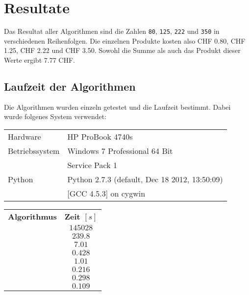 \documentclass[a4paper, 10pt, fleqn]{article}
\begin{document}
\clearpage
\section{Resultate}
Das Resultat aller Algorithmen sind die Zahlen \verb!80!, \verb!125!, 
\verb!222! und \verb!350! in verschiedenen Reihenfolgen. 
Die einzelnen Produkte kosten also CHF 0.80, CHF 1.25, CHF 2.22 und CHF 3.50. 
Sowohl die Summe als auch das Produkt dieser Werte ergibt 7.77 CHF. 

\subsection{Laufzeit der Algorithmen}
Die Algorithmen wurden einzeln getestet und die Laufzeit bestimmt. Dabei wurde 
folgenes System verwendet: 
\begin{table}[h!]
\begin{tabular}{@{}ll}
Hardware        & HP ProBook 4740s \\
Betriebssystem  & Windows 7 Professional 64 Bit \\
                & Service Pack 1 \\
Python          & Python 2.7.3 (default, Dec 18 2012, 13:50:09) \\
                & [GCC 4.5.3] on cygwin
\end{tabular}
\end{table}
\begin{table}[h!]
\begin{tabular}{@{}lc}
\rowcolor{white}\textbf{Algorithmus}                                    
  &\textbf{Zeit $[s]$} \\
\rowcolor{lgray}\nameref{sec:1}
  & $145028$ \\
\rowcolor{white}\nameref{sec:2}
  & $239.8$ \\
\rowcolor{lgray}\nameref{sec:3}
  & $7.01$ \\
\rowcolor{white}\nameref{sec:4}
  & $0.428$ \\
\rowcolor{lgray}\nameref{sec:5}
  & $1.01$ \\
\rowcolor{white}\nameref{sec:6}
  & $0.216$ \\
\rowcolor{lgray}\nameref{sec:7}
  & $0.298$ \\
\rowcolor{white}\nameref{sec:8}
  & $0.109$ \\
\end{tabular}
\end{table}

\clearpage
\end{document}
